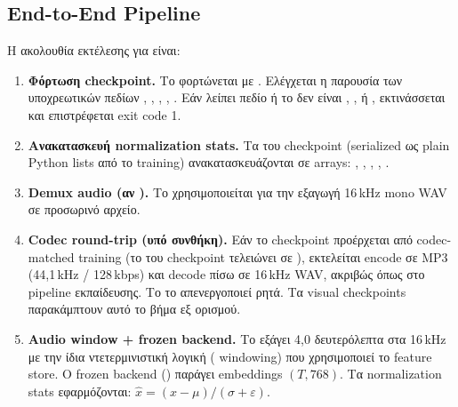 \subsection{End-to-End Pipeline}
\label{subsec:predict-pipeline}

Η ακολουθία εκτέλεσης για  είναι:

\begin{enumerate}
  \item \textbf{Φόρτωση checkpoint.}
        Το  φορτώνεται με .
        Ελέγχεται η παρουσία των υποχρεωτικών πεδίων
        , , ,
        , .
        Εάν λείπει πεδίο ή το  δεν είναι
        , , ή ,
        εκτινάσσεται  και επιστρέφεται exit code 1.

  \item \textbf{Ανακατασκευή normalization stats.}
        Τα  του checkpoint
        (serialized ως plain Python lists από το training)
        ανακατασκευάζονται σε  arrays:
        , ,
        , , .

  \item \textbf{Demux audio (αν ).}
        Το  χρησιμοποιείται για την εξαγωγή
        16\,kHz mono WAV σε προσωρινό αρχείο.

  \item \textbf{Codec round-trip (υπό συνθήκη).}
        Εάν το checkpoint προέρχεται από codec-matched training
        (το  του checkpoint τελειώνει σε ),
        εκτελείται encode σε MP3 (44,1\,kHz / 128\,kbps)
        και decode πίσω σε 16\,kHz WAV,
        ακριβώς όπως στο pipeline εκπαίδευσης.
        Το  το απενεργοποιεί ρητά.
        Τα visual checkpoints παρακάμπτουν αυτό το βήμα εξ ορισμού.

  \item \textbf{Audio window + frozen backend.}
        Το  εξάγει
        4,0 δευτερόλεπτα στα 16\,kHz με την ίδια ντετερμινιστική
        λογική ( windowing) που χρησιμοποιεί το feature store.
        Ο frozen backend
        ()
        παράγει embeddings $(T, 768)$.
        Τα normalization stats εφαρμόζονται:
        $\hat{x} = (x - \mu) / (\sigma + \varepsilon)$.


\end{enumerate}
